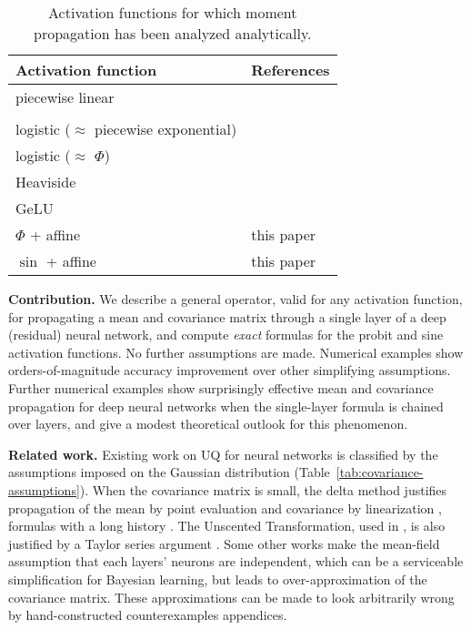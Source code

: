 \documentclass{article}
\begin{document}
\begin{table}[h]
    \centering
    \begin{tabular}{ll}
    Activation function & References \\
    \midrule
    piecewise linear & \citet{bibi_analytic_2018,huber_bayesian_2020}\\
    & \citet{wright_analytic_2024,akgul_deterministic_2025} \\
    logistic (\(\approx\) piecewise exponential) &  \citet{astudillo_propagation_2011,abdelaziz_uncertainty_2015}\\
    logistic (\(\approx\) \(\Phi\)) & \citet{huber_bayesian_2020} \\
    Heaviside &  \citet{wright_analytic_2024}\\
    GeLU & \citet{wright_analytic_2024}\\
    \(\Phi\) + affine & this paper \\
    \(\sin\) + affine & this paper
    \end{tabular}
    \caption{\label{tab:activation-functions} Activation functions for which moment propagation has been analyzed analytically.}
\end{table}

\textbf{Contribution.} We describe a general operator, valid for any activation function, for propagating a mean and covariance matrix through a single layer of a deep (residual) neural network, and compute \emph{exact} formulas for the probit and sine activation functions.
No further assumptions are made.
Numerical examples show orders-of-magnitude accuracy improvement over other simplifying assumptions.
Further numerical examples show surprisingly effective mean and covariance propagation for deep neural networks when the single-layer formula is chained over layers, and give a modest theoretical outlook for this phenomenon.

\textbf{Related work.}
Existing work on UQ for neural networks is classified by the assumptions imposed on the Gaussian distribution (Table~\ref{tab:covariance-assumptions}).
When the covariance matrix is small, the delta method justifies propagation of the mean by point evaluation and covariance by linearization \cite{titensky_uncertainty_2018,nagel_kalman-bucy-informed_2022,petersen_uncertainty_2024,jungmann_analytical_2025}, formulas with a long history \citep[Chapter 187]{gauss_theory_1857} \citep{taylor_introduction_1997}.
The Unscented Transformation, used in \citet{astudillo_propagation_2011,abdelaziz_uncertainty_2015}, is also justified by a Taylor series argument \citep{julier_scaled_2002}.
Some other works \citep{huber_bayesian_2020,wagner_kalman_2022,akgul_deterministic_2025} make the mean-field assumption that each layers' neurons are independent, which can be a serviceable simplification for Bayesian learning, but leads to over-approximation of the covariance matrix.
These approximations can be made to look arbitrarily wrong by hand-constructed counterexamples {\color{red} appendices}.
\end{document}
